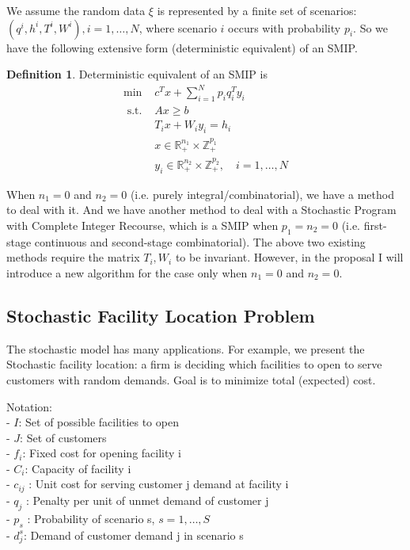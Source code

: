 \documentclass{article}
\theoremstyle{plain}
\theoremstyle{definition}
\newtheorem{definition}[theorem]{Definition}
\begin{document}
We assume the random data  $\xi$  is represented by a finite set of scenarios: $\left(q^{i}, h^{i}, T^{i}, W^{i}\right), i=1, \ldots, N$, where scenario  $i$  occurs with probability  $p_{i}$. So we have the following extensive form (deterministic equivalent) of an SMIP. 

\begin{definition} 
Deterministic equivalent of an SMIP is 
\begin{equation}
\begin{array}{ll}
\min & c^{T} x+\sum_{i=1}^{N} p_{i} q_{i}^{T} y_{i} \\
\text { s.t. } & A x \geq b \\
& T_{i} x+W_{i} y_{i}=h_{i} \\
& x \in \mathbb{R}_{+}^{n_{1}} \times \mathbb{Z}_{+}^{p_{1}} \\
& y_{i} \in \mathbb{R}_{+}^{n_{2}} \times \mathbb{Z}_{+}^{p_{2}}, \quad i=1, \ldots, N
\end{array}
\end{equation}
\end{definition}

When $n_1=0$ and $n_2=0$ (i.e. purely integral/combinatorial),  we have a method \cite{Hemmecke and Schultz 2003} to deal with it. And we have another method \cite{Schultz et al. 1998} to deal with a Stochastic Program with Complete Integer Recourse, which is a SMIP when $p_1=n_2=0$ (i.e. first-stage continuous and second-stage combinatorial). The above two existing methods require the matrix $T_i, W_i$ to be invariant. However, in the proposal I will introduce a new algorithm for the case only when  $n_1=0$ and $n_2=0$.
\subsection{Stochastic Facility Location Problem}
The stochastic model has many applications. For example, we present the Stochastic facility location: a firm is deciding which facilities to open to serve customers with random
demands. Goal is to minimize total (expected) cost.

Notation:\\
\noindent - $I$: Set of possible facilities to open \\
\noindent - $J$: Set of customers \\
\noindent - $f_{i}$:  Fixed cost for opening facility  i  \\
\noindent -  $C_{i}$:  Capacity of facility  i  \\
\noindent -  $c_{i j}$  : Unit cost for serving customer  j  demand at facility  i  \\
\noindent -  $q_{j}$  : Penalty per unit of unmet demand of customer  j  \\
\noindent -  $p_{s}$ : Probability of scenario  s, $s=1, \ldots, S$  \\
\noindent -  $d_{j}^{s} $: Demand of customer demand  j  in scenario  s  \\
\end{document}
